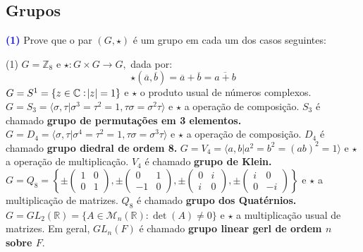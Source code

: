 \documentclass[12pt, a4paper]{article}
\newcommand{\negrito}[1]{\mbox{\boldmath{$#1$}}}
\begin{document}
\subsection{\textcolor{Floresta}{Grupos}}
\textcolor{blue}{\bf(1)} Prove que o par $(G, \star)$ é um grupo em cada um dos casos seguintes:
\begin{tasks}[counter-format={(tsk[a])},label-width=3.6ex, label-format = {\bfseries}, column-sep = {0pt}](1)
\task[\textcolor{Floresta}{$\negrito{(a)} $}] $G = \mathbb{Z}_8$ e $\star \colon G \times G \to G,$ dada por:
\[
\star(\overline{a}, \overline{b}) = \overline{a} + \overline{b} = \overline{a+b}
\]
\task[\textcolor{Floresta}{$\negrito{(b)} $}] $G = S^{1} = \{ z \in \mathbb{C} : \abs{z} = 1 \}$ e $\star$ o produto usual de números complexos.
\task[\textcolor{Floresta}{$\negrito{(c)} $}] $G = S_3 =\langle \sigma, \tau | \sigma^3 = \tau^2 = 1, \tau \sigma = \sigma^2 \tau \rangle$ e $\star$ a operação de composição. $S_3$ é chamado \textbf{grupo de permutações em 3 elementos.}
\task[\textcolor{Floresta}{$\negrito{(d)} $}] $G = D_4 =\langle \sigma, \tau | \sigma^4 = \tau^2 = 1, \tau \sigma = \sigma^3 \tau \rangle$ e $\star$ a operação de composição. $D_4$ é chamado \textbf{grupo diedral de ordem 8.}
\task[\textcolor{Floresta}{$\negrito{(e)} $}] $G = V_4 = \langle a,b | a^2 = b^2 = (ab)^2 = 1 \rangle$ e $\star$ a operação de multiplicação. $V_4$ é chamado \textbf{grupo de Klein.}
\task[\textcolor{Floresta}{$\negrito{(f)} $}] $G = Q_8 = \left\{ \pm \left( \begin{array}{cc} 1 & 0 \\ 0 & 1 \end{array} \right), \pm \left( \begin{array}{cc} 0 & 1 \\ -1 & 0 \end{array}\right), \pm \left( \begin{array}{cc} 0 & i \\ i & 0 \end{array}\right), \pm \left( \begin{array}{cc} i & 0 \\ 0 & -i \end{array}\right) \right\}$ e $\star$ a multiplicação de matrizes. $Q_8$ é chamado \textbf{grupo dos Quatérnios.}
\task[\textcolor{Floresta}{$\negrito{(g)} $}] $G = GL_2(\mathbb{R}) = \{ A \in \mathcal{M}_n(\mathbb{R}) : \det(A) \neq 0 \}$ e $\star$ a multiplicação usual de matrizes. Em geral, $GL_n(F)$ é chamado \textbf{grupo linear gerl de ordem $n$ sobre $F.$}

\end{tasks}
\end{document}
